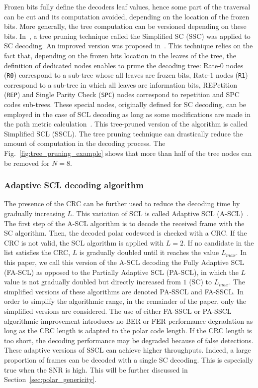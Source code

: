 Frozen bits fully define the decoders leaf values, hence some part of the
traversal can be cut and its computation avoided, depending on the location of
the frozen bits. More generally, the tree computation can be versioned depending
on these bits. In~\cite{Alamdar-Yazdi2011}, a tree pruning technique called the
Simplified SC (SSC) was applied to SC decoding. An improved version was proposed
in~\cite{Sarkis2014a}. This technique relies on the fact that, depending on the
frozen bits location in the leaves of the tree, the definition of dedicated
nodes enables to prune the decoding tree: Rate-0 nodes (\verb|R0|) correspond to
a sub-tree whose all leaves are frozen bits, Rate-1 nodes (\verb|R1|) correspond
to a sub-tree in which all leaves are information bits, REPetition (\verb|REP|)
and Single Parity Check (\verb|SPC|) nodes correspond to repetition and SPC
codes sub-trees. These special nodes, originally defined for SC decoding, can be
employed in the case of SCL decoding as long as some modifications are made in
the path metric calculation~\cite{Sarkis2016}. This tree-pruned version of the
algorithm is called Simplified SCL (SSCL). The tree pruning technique can
drastically reduce the amount of computation in the decoding process. The
Fig.~\ref{fig:tree_pruning_example} shows that more than half of the tree nodes
can be removed for $N = 8$.

\subsubsection{Adaptive SCL decoding algorithm}

The presence of the CRC can be further used to reduce the decoding time by
gradually increasing $L$. This variation of SCL is called Adaptive SCL
(A-SCL)~\cite{Li2012}. The first step of the A-SCL algorithm is to decode the
received frame with the SC algorithm. Then, the decoded polar codeword is
checked with a CRC. If the CRC is not valid, the SCL algorithm is applied with
$L=2$. If no candidate in the list satisfies the CRC, $L$ is gradually doubled
until it reaches the value $L_{max}$. In this paper, we call this version of the
A-SCL decoding the Fully Adaptive SCL (FA-SCL) as opposed to the Partially
Adaptive SCL (PA-SCL), in which the $L$ value is not gradually doubled but
directly increased from $1$ (SC) to $L_{max}$. The simplified versions of these
algorithms are denoted PA-SSCL and FA-SSCL. In order to simplify the algorithmic
range, in the remainder of the paper, only the simplified versions are
considered. The use of either FA-SSCL or PA-SSCL algorithmic improvement
introduces no BER or FER performance degradation as long as the CRC length is
adapted to the polar code length. If the CRC length is too short, the decoding
performance may be degraded because of false detections. These adaptive versions
of SSCL can achieve higher throughputs. Indeed, a large proportion of frames can
be decoded with a single SC decoding. This is especially true when the SNR is
high. This will be further discussed in Section~\ref{sec:polar_genericity}.

